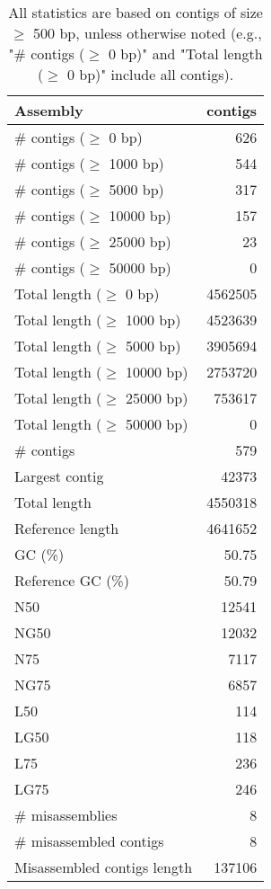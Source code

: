 \documentclass[12pt,a4paper]{article}
\begin{document}
\begin{table}[ht]
\begin{center}
\caption{All statistics are based on contigs of size $\geq$ 500 bp, unless otherwise noted (e.g., "\# contigs ($\geq$ 0 bp)" and "Total length ($\geq$ 0 bp)" include all contigs).}
\begin{tabular}{|l*{1}{|r}|}
\hline
Assembly & contigs \\ \hline
\# contigs ($\geq$ 0 bp) & 626 \\ \hline
\# contigs ($\geq$ 1000 bp) & 544 \\ \hline
\# contigs ($\geq$ 5000 bp) & 317 \\ \hline
\# contigs ($\geq$ 10000 bp) & 157 \\ \hline
\# contigs ($\geq$ 25000 bp) & 23 \\ \hline
\# contigs ($\geq$ 50000 bp) & 0 \\ \hline
Total length ($\geq$ 0 bp) & 4562505 \\ \hline
Total length ($\geq$ 1000 bp) & 4523639 \\ \hline
Total length ($\geq$ 5000 bp) & 3905694 \\ \hline
Total length ($\geq$ 10000 bp) & 2753720 \\ \hline
Total length ($\geq$ 25000 bp) & 753617 \\ \hline
Total length ($\geq$ 50000 bp) & 0 \\ \hline
\# contigs & 579 \\ \hline
Largest contig & 42373 \\ \hline
Total length & 4550318 \\ \hline
Reference length & 4641652 \\ \hline
GC (\%) & 50.75 \\ \hline
Reference GC (\%) & 50.79 \\ \hline
N50 & 12541 \\ \hline
NG50 & 12032 \\ \hline
N75 & 7117 \\ \hline
NG75 & 6857 \\ \hline
L50 & 114 \\ \hline
LG50 & 118 \\ \hline
L75 & 236 \\ \hline
LG75 & 246 \\ \hline
\# misassemblies & 8 \\ \hline
\# misassembled contigs & 8 \\ \hline
Misassembled contigs length & 137106 \\ \hline

\end{tabular}
\end{center}
\end{table}
\end{document}
